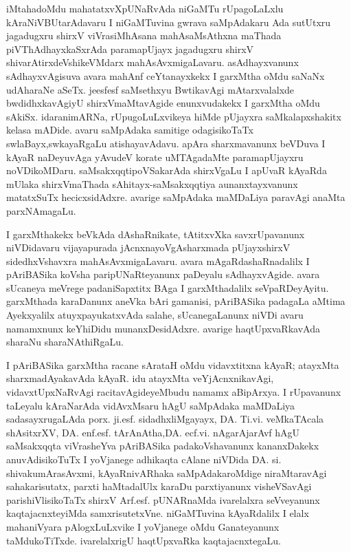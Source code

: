 iMtahadoMdu mahatatxvXpUNaRvAda niGaMTu rUpagoLaLxlu kAraNiVBUtarAdavaru I niGaMTuvina gwrava saMpAdakaru Ada sutUtxru jagadugxru shirxV viVrasiMhAsana mahAsaMsAthxna maThada piVThAdhayxkaSxrAda paramapUjayx jagadugxru shirxV shivarAtirx\break deVshikeVMdarx mahAsAvxmigaLavaru. asAdhayxvanunx sAdhayx\-vAgisuva avara mahAnf ceYtanayxkekx I garxMtha oMdu saNaNx udAharaNe aSeTx. jeesfesf saMsethxyu BwtikavAgi mAtarxvalalxde bwdidhxka\-vAgiyU shirxVmaMtavAgide enunxvudakekx I garxMtha oMdu sAkiSx. idara\break nimARNa, rUpugoLuLxvikeya hiMde pUjayxra saMkalapxshakitx kelasa mADide. avaru saMpAdaka samitige odagisikoTaTx swlaBayx,\break swkayaRgaLu atishayavAdavu. apAra sharxmavanunx beVDuva I kAyaR naDeyuvAga yAvudeV korate uMTAgadaMte parama\-pUjayxru noVDikoMDaru. saMsakxqqtipoVSakarAda shirxVgaLu I apUvaR kAyaRda mUlaka shirxVmaThada sAhitayx-saMsakxqqtiya aunanxtayx\-vanunx matatxSuTx hecicxsidAdxre. avarige saMpAdaka maMDaLiya paravAgi anaMta parxNAmagaLu.

\smallskip

I garxMthakekx beVkAda dAshaRnikate, tAtitxvXka savxrUpavanunx niVDidavaru vijayapurada jAcnxnayoVgAsharxmada pUjayx\break shirxV sidedhxVshavxra mahAsAvxmigaLavaru. avara mAgaRdashaRnadalilx I pAriBASika koVsha paripUNaRteyanunx paDeyalu sAdhayxvAgide. avara sUcaneya meVrege padaniSapxtitx BAga I garxMthadalilx seVpaRDeyAyitu.  garxMthada karaDanunx aneVka bAri gamanisi, pAriBASika padagaLa aMtima Ayekxyalilx atuyxpa\-yukatxvAda salahe, sUcanegaLanunx niVDi avaru namamxnunx keYhiDidu munanxDesidAdxre. avarige haqtUpxvaRkavAda sharaNu sharaNAthiRgaLu.

\smallskip

I pAriBASika garxMtha racane sArataH oMdu vidavxtitxna kAyaR; atayxMta sharxmadAyakavAda kAyaR. idu atayxMta veYjAcnxnika\-vAgi, vidavxtUpxNaRvAgi racitavAgideyeMbudu namamx aBipArxya. I rUpavanunx taLeyalu kAraNarAda vidAvxMsaru hAgU saMpAdaka maMDaLiya sadasayxrugaLAda porx. ji.esf. sidadhxliMgayayx, DA. Ti.vi. veMkaTAcala shAsitxrXV, DA. enf.esf. tArAnAtha,\break DA. ecf.vi. nAgarAjarAvf hAgU saMsakxqqta \hbox{viVrasheYva} pAri\-BASika padakoVshavanunx kananxDakekx anuvAdisikoTuTx I yoVjanege adhi\-kaqta cAlane niVDida DA. si. shivakumArasAvxmi, kAyaRnivARhaka saMpAdakaroMdige niraMtaravAgi sahakarisutatx, parxti haMtadalUlx karaDu parxtiyanunx visheVSavAgi parishiVlisikoTaTx shirxV Arf.esf. pUNARnaMda ivarelalxra seVveyanunx kaqtajacnxteyiMda samxrisutetxVne. niGaMTuvina kAyaRdalilx I elalx mahaniVyara pAlogxLuLxvike I yoVjanege oMdu Ganateyanunx taMdu\-koTiTxde. ivarelalxrigU haqtUpxvaRka kaqtajacnxtegaLu.

